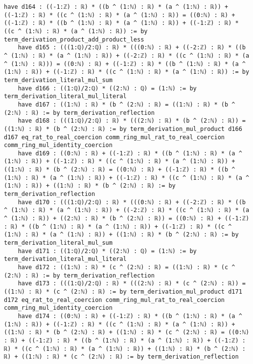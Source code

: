 \documentclass{article}
\begin{document}
\begin{tcolorbox}[colback=white!10, width=\linewidth]
\begin{lstlisting}[language=Lean4]
    have d164 : ((-1:ℤ) : ℝ) * ((b ^ (1:ℕ) : ℝ) * (a ^ (1:ℕ) : ℝ)) + ((-1:ℤ) : ℝ) * ((c ^ (1:ℕ) : ℝ) * (a ^ (1:ℕ) : ℝ)) = ((0:ℕ) : ℝ) + ((-1:ℤ) : ℝ) * ((b ^ (1:ℕ) : ℝ) * (a ^ (1:ℕ) : ℝ)) + ((-1:ℤ) : ℝ) * ((c ^ (1:ℕ) : ℝ) * (a ^ (1:ℕ) : ℝ)) := by term_derivation_product_add_product_less
    have d165 : (((1:ℚ)/2:ℚ) : ℝ) * (((0:ℕ) : ℝ) + ((-2:ℤ) : ℝ) * ((b ^ (1:ℕ) : ℝ) * (a ^ (1:ℕ) : ℝ)) + ((-2:ℤ) : ℝ) * ((c ^ (1:ℕ) : ℝ) * (a ^ (1:ℕ) : ℝ))) = ((0:ℕ) : ℝ) + ((-1:ℤ) : ℝ) * ((b ^ (1:ℕ) : ℝ) * (a ^ (1:ℕ) : ℝ)) + ((-1:ℤ) : ℝ) * ((c ^ (1:ℕ) : ℝ) * (a ^ (1:ℕ) : ℝ)) := by term_derivation_literal_mul_sum
    have d166 : ((1:ℚ)/2:ℚ) * ((2:ℕ) : ℚ) = (1:ℕ) := by term_derivation_literal_mul_literal
    have d167 : ((1:ℕ) : ℝ) * (b ^ (2:ℕ) : ℝ) = ((1:ℕ) : ℝ) * (b ^ (2:ℕ) : ℝ) := by term_derivation_reflection
    have d168 : (((1:ℚ)/2:ℚ) : ℝ) * (((2:ℕ) : ℝ) * (b ^ (2:ℕ) : ℝ)) = ((1:ℕ) : ℝ) * (b ^ (2:ℕ) : ℝ) := by term_derivation_mul_product d166 d167 eq_rat_to_real_coercion comm_ring_mul_rat_to_real_coercion comm_ring_mul_identity_coercion
    have d169 : ((0:ℕ) : ℝ) + ((-1:ℤ) : ℝ) * ((b ^ (1:ℕ) : ℝ) * (a ^ (1:ℕ) : ℝ)) + ((-1:ℤ) : ℝ) * ((c ^ (1:ℕ) : ℝ) * (a ^ (1:ℕ) : ℝ)) + ((1:ℕ) : ℝ) * (b ^ (2:ℕ) : ℝ) = ((0:ℕ) : ℝ) + ((-1:ℤ) : ℝ) * ((b ^ (1:ℕ) : ℝ) * (a ^ (1:ℕ) : ℝ)) + ((-1:ℤ) : ℝ) * ((c ^ (1:ℕ) : ℝ) * (a ^ (1:ℕ) : ℝ)) + ((1:ℕ) : ℝ) * (b ^ (2:ℕ) : ℝ) := by term_derivation_reflection
    have d170 : (((1:ℚ)/2:ℚ) : ℝ) * (((0:ℕ) : ℝ) + ((-2:ℤ) : ℝ) * ((b ^ (1:ℕ) : ℝ) * (a ^ (1:ℕ) : ℝ)) + ((-2:ℤ) : ℝ) * ((c ^ (1:ℕ) : ℝ) * (a ^ (1:ℕ) : ℝ)) + ((2:ℕ) : ℝ) * (b ^ (2:ℕ) : ℝ)) = ((0:ℕ) : ℝ) + ((-1:ℤ) : ℝ) * ((b ^ (1:ℕ) : ℝ) * (a ^ (1:ℕ) : ℝ)) + ((-1:ℤ) : ℝ) * ((c ^ (1:ℕ) : ℝ) * (a ^ (1:ℕ) : ℝ)) + ((1:ℕ) : ℝ) * (b ^ (2:ℕ) : ℝ) := by term_derivation_literal_mul_sum
    have d171 : ((1:ℚ)/2:ℚ) * ((2:ℕ) : ℚ) = (1:ℕ) := by term_derivation_literal_mul_literal
    have d172 : ((1:ℕ) : ℝ) * (c ^ (2:ℕ) : ℝ) = ((1:ℕ) : ℝ) * (c ^ (2:ℕ) : ℝ) := by term_derivation_reflection
    have d173 : (((1:ℚ)/2:ℚ) : ℝ) * (((2:ℕ) : ℝ) * (c ^ (2:ℕ) : ℝ)) = ((1:ℕ) : ℝ) * (c ^ (2:ℕ) : ℝ) := by term_derivation_mul_product d171 d172 eq_rat_to_real_coercion comm_ring_mul_rat_to_real_coercion comm_ring_mul_identity_coercion
    have d174 : ((0:ℕ) : ℝ) + ((-1:ℤ) : ℝ) * ((b ^ (1:ℕ) : ℝ) * (a ^ (1:ℕ) : ℝ)) + ((-1:ℤ) : ℝ) * ((c ^ (1:ℕ) : ℝ) * (a ^ (1:ℕ) : ℝ)) + ((1:ℕ) : ℝ) * (b ^ (2:ℕ) : ℝ) + ((1:ℕ) : ℝ) * (c ^ (2:ℕ) : ℝ) = ((0:ℕ) : ℝ) + ((-1:ℤ) : ℝ) * ((b ^ (1:ℕ) : ℝ) * (a ^ (1:ℕ) : ℝ)) + ((-1:ℤ) : ℝ) * ((c ^ (1:ℕ) : ℝ) * (a ^ (1:ℕ) : ℝ)) + ((1:ℕ) : ℝ) * (b ^ (2:ℕ) : ℝ) + ((1:ℕ) : ℝ) * (c ^ (2:ℕ) : ℝ) := by term_derivation_reflection

\end{lstlisting}
\end{tcolorbox}
\end{document}
